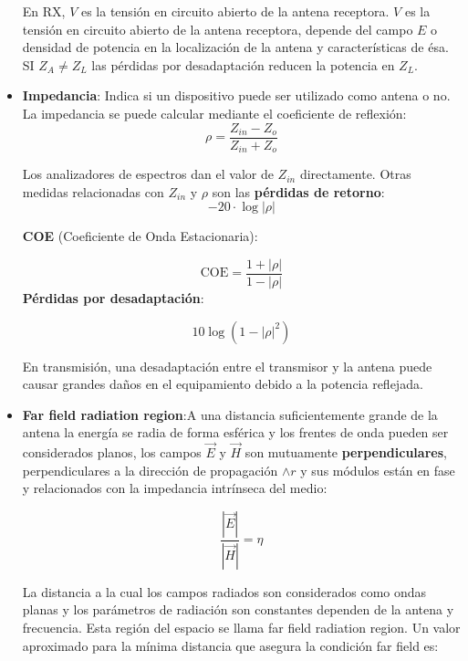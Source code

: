 \documentclass[10pt,portrait, twocolumn]{article}
\begin{document}
\begin{itemize}
		En RX, $V$ es la tensión en circuito abierto de la antena receptora. $V$ es la tensión en circuito abierto de la antena receptora, depende del campo $E$ o densidad de potencia en la localización de la antena y características de ésa. SI $Z_{A} \neq Z_{L}$ las pérdidas por desadaptación reducen la potencia en $Z_{L}$.
		
		\item \textbf{Impedancia}: Indica si un dispositivo puede ser utilizado como antena o no. La impedancia se puede calcular mediante el coeficiente de reflexión:
			\begin{equation*}
				\rho = \frac{Z_{in} - Z_{o}}{Z_{in} + Z_{o}}
			\end{equation*}
			
		Los analizadores de espectros dan el valor de $Z_{in}$ directamente. Otras medidas relacionadas con $Z_{in}$ y $\rho$ son las \textbf{pérdidas de retorno}:
			\begin{equation*}
				-20 \cdot \log |\rho|
			\end{equation*}
			
		\textbf{COE} (Coeficiente de Onda Estacionaria):
		
			\begin{equation*}
				\text{COE} = \frac{1 + |\rho|}{1 - |\rho|}
			\end{equation*}
		\textbf{Pérdidas por desadaptación}:
		
			\begin{equation*}
				10 \log (1 - |\rho|^{2})
			\end{equation*}
			
		En transmisión, una desadaptación entre el transmisor y la antena puede causar grandes daños en el equipamiento debido a la potencia reflejada.
		
		\item \textbf{Far field radiation region}:A una distancia suficientemente grande de la antena la energía se radia de forma esférica y los frentes de onda pueden ser considerados planos, los campos $\vec{E}$ y $\vec{H}$ son mutuamente \textbf{perpendiculares}, perpendiculares a la dirección de propagación $\wedge{r}$ y sus módulos están en fase y relacionados con la impedancia intrínseca del medio:

	\begin{equation*}
		\frac{|\vec{E}|}{|\vec{H}|} = \eta
	\end{equation*}
	
La distancia a la cual los campos radiados son considerados como ondas planas y los parámetros de radiación son constantes dependen de la antena y frecuencia. Esta región del espacio se llama far field radiation region. Un valor aproximado para la mínima distancia que asegura la condición far field es:


\end{itemize}
\end{document}

